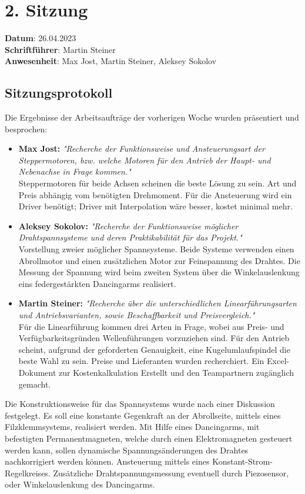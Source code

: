 \section{2. Sitzung}
\label{sec:2_sitzung}

\textbf{Datum}: 26.04.2023\\
\textbf{Schriftführer}: Martin Steiner\\
\textbf{Anwesenheit}: Max Jost, Martin Steiner, Aleksey Sokolov

\subsection*{Sitzungsprotokoll}

Die Ergebnisse der Arbeitsaufträge der vorherigen Woche wurden präsentiert und besprochen:
\begin{itemize}
    \item \textbf{Max Jost:} \textit{"Recherche der Funktionsweise und Ansteuerungsart der Steppermotoren, bzw. welche Motoren für den Antrieb der Haupt- und Nebenachse in Frage kommen."}\\
    Steppermotoren für beide Achsen scheinen die beste Lösung zu sein. Art und Preis abhängig vom benötigten Drehmoment. Für die Ansteuerung wird ein Driver benötigt; Driver mit Interpolation wäre besser, kostet minimal mehr.
    \item \textbf{Aleksey Sokolov:} \textit{"Recherche der Funktionsweise möglicher Drahtspannsysteme und deren Praktikabilität für das Projekt."}\\
    Vorstellung zweier möglicher Spannsysteme. Beide Systeme verwenden einen Abrollmotor und einen zusätzlichen Motor zur Feinspannung des Drahtes. Die Messung der Spannung wird beim zweiten System über die Winkelauslenkung eins federgestärkten Dancingarms realisiert.
    \item \textbf{Martin Steiner:} \textit{"Recherche über die unterschiedlichen Linearführungsarten und Antriebsvarianten, sowie Beschaffbarkeit und Preisvergleich."}\\
    Für die Linearführung kommen drei Arten in Frage, wobei aus Preis- und Verfügbarkeitsgründen Wellenführungen vorzuziehen sind. Für den Antrieb scheint, aufgrund der geforderten Genauigkeit, eine Kugelumlaufspindel die beste Wahl zu sein. Preise und Lieferanten wurden recherchiert. Ein Excel-Dokument zur Kostenkalkulation Erstellt und den Teampartnern zugänglich gemacht.
\end{itemize}

Die Konstruktionsweise für das Spannsystems wurde nach einer Diskussion festgelegt. Es soll eine konstante Gegenkraft an der Abrollseite, mittels eines Filzklemmsystems, realisiert werden. Mit Hilfe eines Dancingarms, mit befestigten Permanentmagneten, welche durch einen Elektromagneten gesteuert werden kann, sollen dynamische Spannungsänderungen des Drahtes nachkorrigiert werden können. Ansteuerung mittels eines Konstant-Strom-Regelkreises. Zusätzliche Drahtspannungsmessung eventuell durch Piezosensor, oder Winkelauslenkung des Dancingarms.\\

